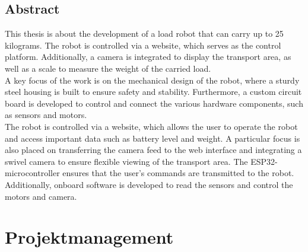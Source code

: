 \documentclass[ngerman,12pt,a4paper]{article}
\begin{document}
	\newpage
	
	\subsection{Abstract}
	
	This thesis is about the development of a load robot that can carry up to 25 kilograms. The robot is controlled via a website, which serves as the control platform. Additionally, a camera is integrated to display the transport area, as well as a scale to measure the weight of the carried load.\\[0.5 cm]
	A key focus of the work is on the mechanical design of the robot, where a sturdy steel housing is built to ensure safety and stability. Furthermore, a custom circuit board is developed to control and connect the various hardware components, such as sensors and motors.\\[0.5 cm]
	The robot is controlled via a website, which allows the user to operate the robot and access important data such as battery level and weight. A particular focus is also placed on transferring the camera feed to the web interface and integrating a swivel camera to ensure flexible viewing of the transport area. The ESP32-microcontroller ensures that the user's commands are transmitted to the robot.\\[0.5 cm]
	Additionally, onboard software is developed to read the sensors and control the motors and camera.
	\fancyfoot[L]{}
	\thispagestyle{fancy}
	\newpage
	\section{Projektmanagement}
	
\end{document}
